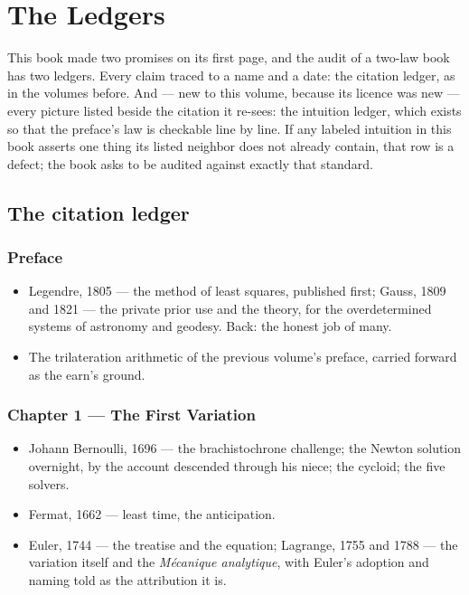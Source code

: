 \chapter{The Ledgers}

This book made two promises on its first page, and the audit of a
two-law book has two ledgers. Every claim traced to a name and a date:
the citation ledger, as in the volumes before. And --- new to this
volume, because its licence was new --- every picture listed beside the
citation it re-sees: the intuition ledger, which exists so that the
preface's law is checkable line by line. If any labeled intuition in
this book asserts one thing its listed neighbor does not already
contain, that row is a defect; the book asks to be audited against
exactly that standard.

\section*{The citation ledger}

\subsection*{Preface}
\begin{itemize}
\item Legendre, 1805 --- the method of least squares, published first;
Gauss, 1809 and 1821 --- the private prior use and the theory, for the
overdetermined systems of astronomy and geodesy. Back: the honest job of
many.
\item The trilateration arithmetic of the previous volume's preface,
carried forward as the earn's ground.
\end{itemize}

\subsection*{Chapter 1 --- The First Variation}
\begin{itemize}
\item Johann Bernoulli, 1696 --- the brachistochrone challenge; the
Newton solution overnight, by the account descended through his niece;
the cycloid; the five solvers.
\item Fermat, 1662 --- least time, the anticipation.
\item Euler, 1744 --- the treatise and the equation; Lagrange, 1755 and
1788 --- the variation itself and the \emph{M\'ecanique analytique},
with Euler's adoption and naming told as the attribution it is.
\end{itemize}


